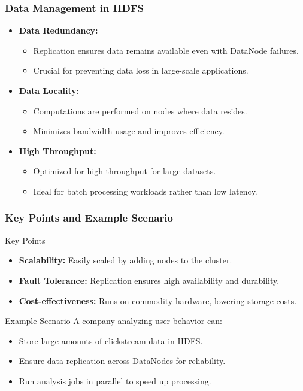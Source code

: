 \documentclass[aspectratio=169]{beamer}
\begin{document}
\begin{frame}[fragile]
    \frametitle{Data Management in HDFS}
    \begin{itemize}
        \item \textbf{Data Redundancy:}
        \begin{itemize}
            \item Replication ensures data remains available even with DataNode failures.
            \item Crucial for preventing data loss in large-scale applications.
        \end{itemize}
        \item \textbf{Data Locality:}
        \begin{itemize}
            \item Computations are performed on nodes where data resides.
            \item Minimizes bandwidth usage and improves efficiency.
        \end{itemize}
        \item \textbf{High Throughput:}
        \begin{itemize}
            \item Optimized for high throughput for large datasets.
            \item Ideal for batch processing workloads rather than low latency.
        \end{itemize}
    \end{itemize}
\end{frame}

\begin{frame}[fragile]
    \frametitle{Key Points and Example Scenario}
    \begin{block}{Key Points}
        \begin{itemize}
            \item \textbf{Scalability:} Easily scaled by adding nodes to the cluster.
            \item \textbf{Fault Tolerance:} Replication ensures high availability and durability.
            \item \textbf{Cost-effectiveness:} Runs on commodity hardware, lowering storage costs.
        \end{itemize}
    \end{block}
    \begin{block}{Example Scenario}
        A company analyzing user behavior can:
        \begin{itemize}
            \item Store large amounts of clickstream data in HDFS.
            \item Ensure data replication across DataNodes for reliability.
            \item Run analysis jobs in parallel to speed up processing.
        \end{itemize}
    \end{block}
\end{frame}
\end{document}
